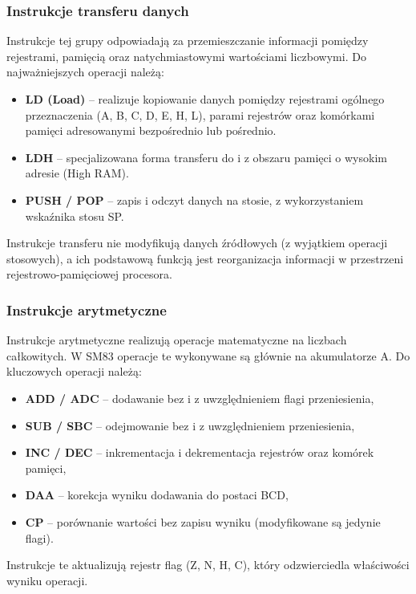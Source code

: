 \documentclass{article}
\begin{document}
\subsubsection{Instrukcje transferu danych}

Instrukcje tej grupy odpowiadają za przemieszczanie informacji pomiędzy rejestrami, pamięcią oraz natychmiastowymi wartościami liczbowymi. Do najważniejszych operacji należą:

\begin{itemize}
	\item \textbf{LD (Load)} -- realizuje kopiowanie danych pomiędzy rejestrami ogólnego przeznaczenia (A, B, C, D, E, H, L), parami rejestrów oraz komórkami pamięci adresowanymi bezpośrednio lub pośrednio.
	\item \textbf{LDH} -- specjalizowana forma transferu do i z obszaru pamięci o wysokim adresie (High RAM).
	\item \textbf{PUSH / POP} -- zapis i odczyt danych na stosie, z wykorzystaniem wskaźnika stosu SP.
\end{itemize}

Instrukcje transferu nie modyfikują danych źródłowych (z wyjątkiem operacji stosowych), a ich podstawową funkcją jest reorganizacja informacji w przestrzeni rejestrowo-pamięciowej procesora.

\subsubsection{Instrukcje arytmetyczne}

Instrukcje arytmetyczne realizują operacje matematyczne na liczbach całkowitych. W SM83 operacje te wykonywane są głównie na akumulatorze A. Do kluczowych operacji należą:

\begin{itemize}
	\item \textbf{ADD / ADC} -- dodawanie bez i z uwzględnieniem flagi przeniesienia,
	\item \textbf{SUB / SBC} -- odejmowanie bez i z uwzględnieniem przeniesienia,
	\item \textbf{INC / DEC} -- inkrementacja i dekrementacja rejestrów oraz komórek pamięci,
	\item \textbf{DAA} -- korekcja wyniku dodawania do postaci BCD,
	\item \textbf{CP} -- porównanie wartości bez zapisu wyniku (modyfikowane są jedynie flagi).
\end{itemize}

Instrukcje te aktualizują rejestr flag (Z, N, H, C), który odzwierciedla właściwości wyniku operacji.
\end{document}
